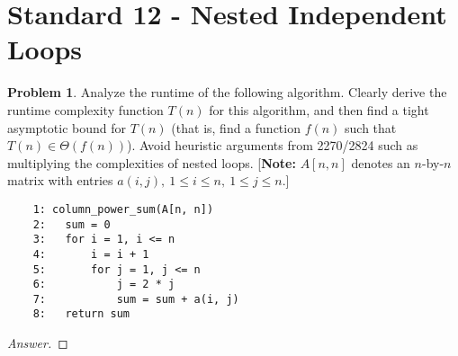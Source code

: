 \documentclass[11pt]{article}
\theoremstyle{definition}
\theoremstyle{definition}
\newtheorem{required}{Problem}
\theoremstyle{definition}
\begin{document}
\newpage
\section{Standard 12 - Nested Independent Loops}
\begin{required}
Analyze the runtime of the following algorithm. Clearly derive the runtime complexity function $T(n)$ for this algorithm, and then find a tight asymptotic bound for $T(n)$ (that is, find a function $f(n)$ such that $T(n) \in \Theta(f(n))$). Avoid heuristic arguments from 2270/2824 such as multiplying the complexities of nested loops. [\textbf{Note:} $A[n, n]$ denotes an $n$-by-$n$ matrix with entries $a(i, j),~1\leq i\leq n,~1\leq j\leq n$.]


\begin{verbatim}
	1: column_power_sum(A[n, n])
	2:   sum = 0
	3:   for i = 1, i <= n
	4:       i = i + 1
	5:       for j = 1, j <= n 
	6:           j = 2 * j
	7:           sum = sum + a(i, j)
	8:   return sum
\end{verbatim}

\end{required}

\begin{proof}[Answer]
\end{proof}



\end{document}
